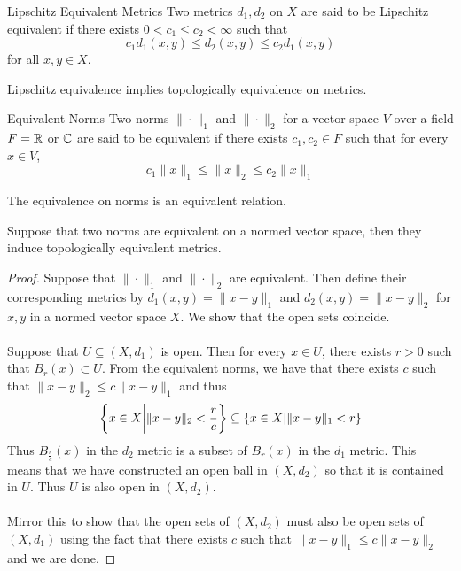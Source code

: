 \documentclass[a4paper]{article}
\begin{document}
\begin{defn}{Lipschitz Equivalent Metrics}{} Two metrics $d_1,d_2$ on $X$ are said to be Lipschitz equivalent if there exists $0<c_1\leq c_2<\infty$ such that $$c_1d_1(x,y)\leq d_2(x,y)\leq c_2d_1(x,y)$$ for all $x,y\in X$. 
\end{defn}

\begin{lmm}{}{} Lipschitz equivalence implies topologically equivalence on metrics. 
\end{lmm}

\begin{defn}{Equivalent Norms}{} Two norms $\|\cdot\|_1$ and $\|\cdot\|_2$ for a vector space $V$ over a field $F=\mathbb{R}$ or $\mathbb{C}$ are said to be equivalent if there exists $c_1,c_2\in F$ such that for every $x\in V$, $$c_1\|x\|_1\leq\|x\|_2\leq c_2\|x\|_1$$
\end{defn}

\begin{prp}{}{} The equivalence on norms is an equivalent relation. 
\end{prp}

\begin{prp}{}{} Suppose that two norms are equivalent on a normed vector space, then they induce topologically equivalent metrics. \tcbline
\begin{proof}
Suppose that $\|\cdot\|_1$ and $\|\cdot\|_2$ are equivalent. Then define their corresponding metrics by $d_1(x,y)=\|x-y\|_1$ and $d_2(x,y)=\|x-y\|_2$ for $x,y$ in a normed vector space $X$. We show that the open sets coincide. \\~\\
Suppose that $U\subseteq(X,d_1)$ is open. Then for every $x\in U$, there exists $r>0$ such that $B_r(x)\subset U$. From the equivalent norms, we have that there exists $c$ such that $\|x-y\|_2\leq c\|x-y\|_1$ and thus $$\left\{x\in X\bigg{|}\|x-y\|_2<\frac{r}{c}\right\}\subseteq\{x\in X|\|x-y\|_1<r\}$$ Thus $B_{\frac{r}{c}}(x)$ in the $d_2$ metric is a subset of $B_r(x)$ in the $d_1$ metric. This means that we have constructed an open ball in $(X,d_2)$ so that it is contained in $U$. Thus $U$ is also open in $(X,d_2)$. \\~\\
Mirror this to show that the open sets of $(X,d_2)$ must also be open sets of $(X,d_1)$ using the fact that there exists $c$ such that $\|x-y\|_1\leq c\|x-y\|_2$ and we are done. 
\end{proof}
\end{prp}
\end{document}
